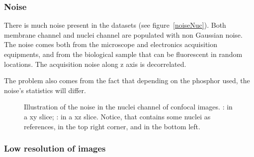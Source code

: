 
\subsubsection{Noise}
There is much noise present in the datasets (see figure~\ref{noiseNuc}). Both membrane channel and nuclei channel are populated with non Gaussian noise.
The noise comes both from the microscope and electronics acquisition equipments, and from the biological sample that can be fluorescent in random locations.
The acquisition noise along z axis is decorrelated.

The problem also comes from the fact that depending on the phosphor used, the noise's statistics will differ.
\begin{figure}[htb]
\centering
   \hspace{5pt}
  \caption{%
    Illustration of the noise in the nuclei channel of confocal images.
    : in a xy slice;
    : in a xz slice. 
    Notice, that  contains some nuclei as references, in the top right corner, and  in the bottom left.}
\label{fig:noiseNuc}
\end{figure}




\subsubsection{Low resolution of images}

